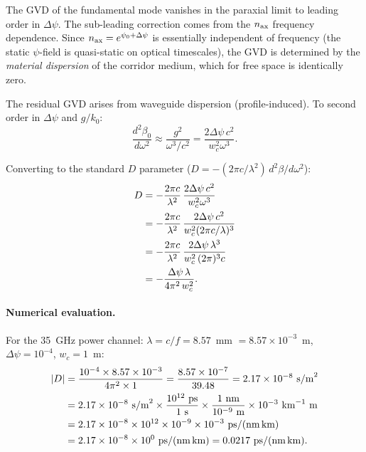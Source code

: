 \documentclass[aps,prd,twocolumn,superscriptaddress,nofootinbib]{revtex4-2}
\begin{document}
The GVD of the fundamental mode vanishes in the paraxial limit to leading
order in $\Delta\psi$.  The sub-leading correction comes from the
$n_{\rm ax}$ frequency dependence.  Since $n_{\rm ax} = e^{\psi_0 + \Delta\psi}$
is essentially independent of frequency (the static $\psi$-field is
quasi-static on optical timescales), the GVD is determined by the
\emph{material dispersion} of the corridor medium, which for free space
is identically zero.

The residual GVD arises from waveguide dispersion (profile-induced).  To
second order in $\Delta\psi$ and $g/k_0$:
\begin{equation}
\frac{d^2\beta_0}{d\omega^2}
\approx \frac{g^2}{\omega^3/c^2}
= \frac{2\Delta\psi\,c^2}{w_c^2\omega^3}.
\label{eq:gvd-exact}
\end{equation}

Converting to the standard $D$ parameter
($D = -(2\pi c/\lambda^2)\,d^2\beta/d\omega^2$):
\begin{align}
D &= -\frac{2\pi c}{\lambda^2}\,\frac{2\Delta\psi\,c^2}{w_c^2\omega^3} \notag\\
&= -\frac{2\pi c}{\lambda^2}\,\frac{2\Delta\psi\,c^2}{w_c^2(2\pi c/\lambda)^3} \notag\\
&= -\frac{2\pi c}{\lambda^2}\,\frac{2\Delta\psi\,\lambda^3}
{w_c^2\,(2\pi)^3 c} \notag\\
&= -\frac{\Delta\psi\,\lambda}{4\pi^2\,w_c^2}.
\label{eq:D-formula}
\end{align}

\paragraph{Numerical evaluation.}
For the 35~GHz power channel: $\lambda = c/f = 8.57$~mm $= 8.57\times10^{-3}$~m,
$\Delta\psi = 10^{-4}$, $w_c = 1$~m:
\begin{align}
|D| &= \frac{10^{-4}\times 8.57\times10^{-3}}{4\pi^2\times 1}
= \frac{8.57\times10^{-7}}{39.48} = 2.17\times10^{-8}~\text{s/m}^2 \notag\\
&= 2.17\times10^{-8}~\text{s/m}^2
\times \frac{10^{12}~\text{ps}}{1~\text{s}}
\times \frac{1~\text{nm}}{10^{-9}~\text{m}}
\times 10^{-3}~\text{km}^{-1}~\text{m} \notag\\
&= 2.17\times10^{-8}\times 10^{12}\times 10^{-9}\times 10^{-3}~\text{ps/(nm\,km)} \notag\\
&= 2.17\times10^{-8}\times10^{0}~\text{ps/(nm\,km)}
= 0.0217~\text{ps/(nm\,km)}.
\end{align}
\end{document}
